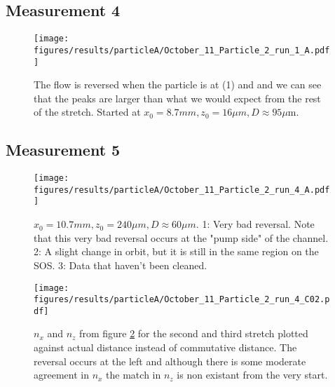 \subsection{Measurement 4}
\begin{figure}[H]
\begin{center}
\texttt{[image: figures/results/particleA/October\_11\_Particle\_2\_run\_1\_A.pdf]}
\end{center}
\caption{The flow is reversed when the particle is at (1) and and we can see that the peaks are larger than what we would expect from the rest of the stretch. Started at $x_0 = 8.7 mm, z_0 = 16\mu m, D \approx 95\mu$m.}
\label{fig:particleA4}
\end{figure}

\subsection{Measurement 5}
\begin{figure}[H]
\centering
\texttt{[image: figures/results/particleA/October\_11\_Particle\_2\_run\_4\_A.pdf]}
\caption{$x_0 = 10.7 mm, z_0 = 240 \mu m, D \approx 60\mu m$.
1: Very bad reversal. Note that this very bad reversal occurs at the "pump side" of the channel. 
 2: A slight change in orbit, but it is still in the same region on the SOS.
 3: Data that haven't been cleaned.}
\label{fig:particleA5}
\end{figure}

 
 \begin{figure}[H]
 \centering
 \texttt{[image: figures/results/particleA/October\_11\_Particle\_2\_run\_4\_C02.pdf]}
 \caption{$n_x$ and $n_z$ from figure \ref{fig:particleA5} for the second and third stretch plotted against actual distance instead of commutative distance. The reversal occurs at the left and although there is some moderate agreement in $n_x$ the match in $n_z$ is non existant from the very start.}
 \label{fig:particleABadReversal}
 \end{figure}